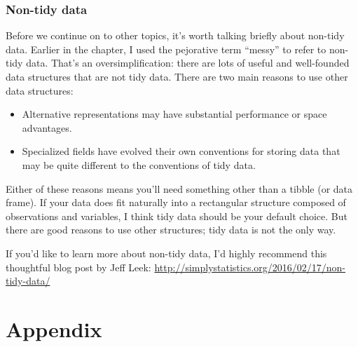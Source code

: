 \documentclass[]{book}
\newenvironment{Shaded}{\begin{snugshade}}{\end{snugshade}}
\newcommand{\KeywordTok}[1]{\textcolor[rgb]{0.13,0.29,0.53}{\textbf{#1}}}
\newcommand{\StringTok}[1]{\textcolor[rgb]{0.31,0.60,0.02}{#1}}
\newcommand{\CommentTok}[1]{\textcolor[rgb]{0.56,0.35,0.01}{\textit{#1}}}
\newcommand{\OperatorTok}[1]{\textcolor[rgb]{0.81,0.36,0.00}{\textbf{#1}}}
\newcommand{\NormalTok}[1]{#1}
\theoremstyle{definition}
\theoremstyle{definition}
\theoremstyle{definition}
\theoremstyle{remark}
\begin{document}
\begin{Shaded}
\end{Shaded}

\section{Non-tidy data}\label{non-tidy-data}

Before we continue on to other topics, it's worth talking briefly about
non-tidy data. Earlier in the chapter, I used the pejorative term
``messy'' to refer to non-tidy data. That's an oversimplification: there
are lots of useful and well-founded data structures that are not tidy
data. There are two main reasons to use other data structures:

\begin{itemize}
\item
  Alternative representations may have substantial performance or space
  advantages.
\item
  Specialized fields have evolved their own conventions for storing data
  that may be quite different to the conventions of tidy data.
\end{itemize}

Either of these reasons means you'll need something other than a tibble
(or data frame). If your data does fit naturally into a rectangular
structure composed of observations and variables, I think tidy data
should be your default choice. But there are good reasons to use other
structures; tidy data is not the only way.

If you'd like to learn more about non-tidy data, I'd highly recommend
this thoughtful blog post by Jeff Leek:
\url{http://simplystatistics.org/2016/02/17/non-tidy-data/}

\part{Appendix}\label{part-appendix}
\end{document}
